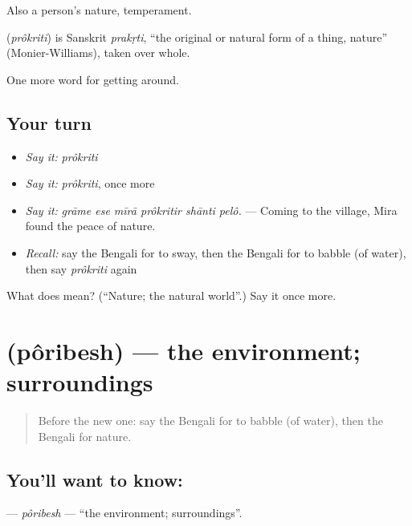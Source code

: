 Also a person's nature, temperament.

\begin{cousinweb}
\textbf{} (\emph{prôkriti}) is Sanskrit \emph{prakṛti}, \textquotedblleft{}the original or natural form of a thing, nature\textquotedblright{} (Monier-Williams), taken over whole.
\end{cousinweb}

\begin{grammarlens}[title={What you've built}]
One more word for getting around.
\end{grammarlens}

\subsection*{Your turn}
\begin{itemize}
\raggedright
  \item \emph{Say it:} \emph{prôkriti}
  \item \emph{Say it:} \emph{prôkriti}, once more
  \item \emph{Say it:} \emph{grāme ese mīrā prôkritir shānti pelô.} — Coming to the village, Mira found the peace of nature.
  \item \emph{Recall:} say the Bengali for to sway, then the Bengali for to babble (of water), then say \emph{prôkriti} again
\end{itemize}

\begin{tcolorbox}[breakable,colback=teal!4,colframe=teal!35!black,title={Before you move on}]
What does  mean? (\textquotedblleft{}Nature; the natural world\textquotedblright{}.) Say it once more.
\end{tcolorbox}
\section[\texorpdfstring{\bn{পরিবেশ} (pôribesh)}{পরিবেশ (pôribesh)}]{ (pôribesh) — the environment; surroundings}

\label{lesson:BN-C434-poribesh}



\begin{quote}
Before the new one: say the Bengali for to babble (of water), then the Bengali for nature.
\end{quote}

\subsection*{You'll want to know: }
\textbf{} — \emph{pôribesh} — \textquotedblleft{}the environment; surroundings\textquotedblright{}.

